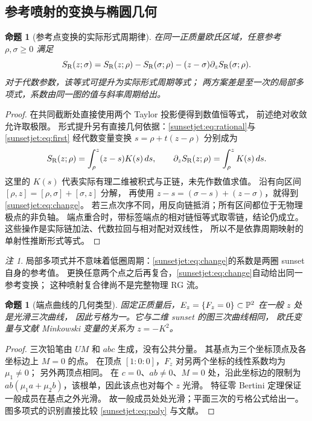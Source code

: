 \documentclass[11pt,a4paper,oneside]{ctexart}
\theoremstyle{cnplain}
\newtheorem{proposition}[theorem]{命题}
\theoremstyle{definition}
\theoremstyle{remark}
\newtheorem{remark}[theorem]{注}
\numberwithin{equation}{section}
\begin{document}
\subsection{参考喷射的变换与椭圆几何}
\begin{proposition}[参考点变换的实际形式周期律]\label{sunsetjet:prop:reference}
在同一正质量欧氏区域，任意参考 $\rho,\sigma\geq0$ 满足
\begin{equation}\label{sunsetjet:eq:change}
 S_{\mathrm R}(z;\sigma)=S_{\mathrm R}(z;\rho)-S_{\mathrm R}(\sigma;\rho)
                -(z-\sigma)\partial_zS_{\mathrm R}(\sigma;\rho).
\end{equation}
对于代数参数，该等式可提升为实际形式周期等式；
两方案差是至一次的局部多项式，系数由同一图的值与斜率周期给出。
\end{proposition}
\begin{proof}
在共同截断处直接使用两个 Taylor 投影便得到数值恒等式，
前述绝对收敛允许取极限。
形式提升另有直接几何依据：\eqref{sunsetjet:eq:rational}与\eqref{sunsetjet:eq:first}
经代数变量变换 $s=\rho+t(z-\rho)$ 分别成为
\begin{equation}\label{sunsetjet:eq:weighted}
 S_{\mathrm R}(z;\rho)=\int_\rho^z(z-s)K(s)\,ds,\qquad
 \partial_zS_{\mathrm R}(z;\rho)=\int_\rho^zK(s)\,ds.
\end{equation}
这里的 $K(s)$ 代表实际有理二维被积式与正链，未先作数值求值。
沿有向区间 $[\rho,z]=[\rho,\sigma]+[\sigma,z]$ 分解，
再使用 $z-s=(\sigma-s)+(z-\sigma)$，就得到 \eqref{sunsetjet:eq:change}。
若三点次序不同，用反向链抵消；所有区间都位于无物理极点的非负轴。
端点重合时，带标签端点的相对链恒等式取零链，结论仍成立。
这些操作是实际链加法、代数拉回与相对配对双线性，
所以不是依靠周期映射的单射性推断形式等式。
\end{proof}

\begin{remark}
局部多项式并不意味着低圈周期：\eqref{sunsetjet:eq:change}的系数是两圈 sunset 自身的参考值。
更换任意两个点之后再复合，\eqref{sunsetjet:eq:change}自动给出同一参考变换；
这种喷射复合律尚不是完整物理 RG 流。
\end{remark}

\begin{proposition}[端点曲线的几何类型]\label{sunsetjet:prop:elliptic}
固定正质量后，$E_z=\{F_z=0\}\subset\mathbb P^2$ 在一般 $z$ 处是光滑三次曲线，
因此亏格为一。它与二维 sunset 的图三次曲线相同，
欧氏变量与文献 Minkowski 变量的关系为 $z=-K^2$。
\end{proposition}
\begin{proof}
三次铅笔由 $UM$ 和 $abc$ 生成，没有公共分量。
其基点为三个坐标顶点及各坐标边上 $M=0$ 的点。
在顶点 $[1:0:0]$，$F_z$ 对另两个坐标的线性系数均为 $\mu_1\ne0$；
另外两顶点相同。
在 $c=0$、$ab\ne0$、$M=0$ 处，沿此坐标边的限制为
$ab(\mu_1a+\mu_2b)$，该根单，因此该点也对每个 $z$ 光滑。
特征零 Bertini 定理保证一般成员在基点之外光滑。
故一般成员处处光滑；平面三次的亏格公式给出一。
图多项式的识别直接比较 \eqref{sunsetjet:eq:poly} 与文献\cite[式(2.5)--(2.6)]{bv}。
\end{proof}
\end{document}
